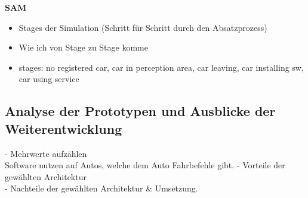 \textbf{SAM\\}
\begin{itemize}
	\item Stages der Simulation (Schritt für Schritt durch den Absatzprozess)
	\item Wie ich von Stage zu Stage komme
	\item stages: no registered car, car in perception area, car leaving, car installing sw, car using service
\end{itemize}
\subsection{Analyse der Prototypen und Ausblicke der Weiterentwicklung}
- Mehrwerte aufzählen\\
   Software nutzen auf Autos, welche dem Auto Fahrbefehle gibt.
- Vorteile der gewählten Architektur\\
- Nachteile der gewählten Architektur \& Umsetzung.
